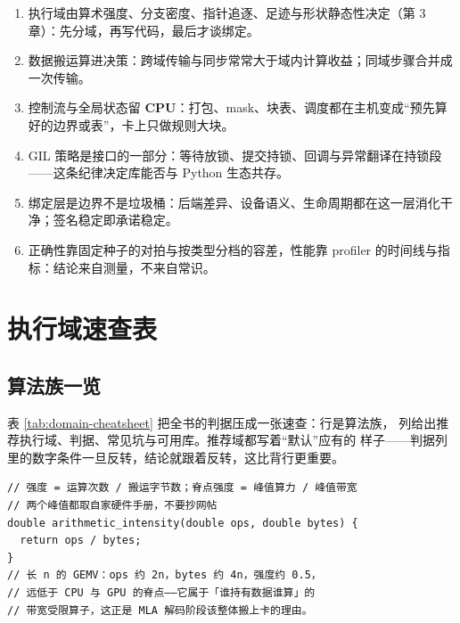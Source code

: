 \documentclass[12pt,a4paper,fontset=fandol]{ctexbook}
\newcommand{\Dom}[1]{\textsf{\bfseries #1}}
\newcommand{\CPU}{\Dom{CPU}}
\begin{document}
\begin{guideline}[title={全书六条判断}]
\begin{enumerate}
\item 执行域由算术强度、分支密度、指针追逐、足迹与形状静态性决定（第 3 章）：先分域，再写代码，最后才谈绑定。
\item 数据搬运算进决策：跨域传输与同步常常大于域内计算收益；同域步骤合并成一次传输。
\item 控制流与全局状态留 \CPU{}：打包、mask、块表、调度都在主机变成``预先算好的边界或表''，卡上只做规则大块。
\item GIL 策略是接口的一部分：等待放锁、提交持锁、回调与异常翻译在持锁段——这条纪律决定库能否与 Python 生态共存。
\item 绑定层是边界不是垃圾桶：后端差异、设备语义、生命周期都在这一层消化干净；签名稳定即承诺稳定。
\item 正确性靠固定种子的对拍与按类型分档的容差，性能靠 profiler 的时间线与指标：结论来自测量，不来自常识。
\end{enumerate}
\end{guideline}
\appendix

\chapter{执行域速查表}

\section{算法族一览}

表 \ref{tab:domain-cheatsheet} 把全书的判据压成一张速查：行是算法族，
列给出推荐执行域、判据、常见坑与可用库。推荐域都写着``默认''应有的
样子——判据列里的数字条件一旦反转，结论就跟着反转，这比背行更重要。

\begin{lstlisting}[style=cppstyle,caption={判据的第一项：算术强度粗估}]
// 强度 = 运算次数 / 搬运字节数；脊点强度 = 峰值算力 / 峰值带宽
// 两个峰值都取自家硬件手册，不要抄网帖
double arithmetic_intensity(double ops, double bytes) {
  return ops / bytes;
}
// 长 n 的 GEMV：ops 约 2n，bytes 约 4n，强度约 0.5，
// 远低于 CPU 与 GPU 的脊点——它属于「谁持有数据谁算」的
// 带宽受限算子，这正是 MLA 解码阶段该整体搬上卡的理由。
\end{lstlisting}
\end{document}
